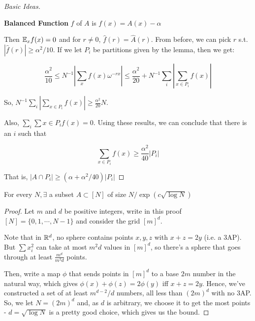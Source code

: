 \documentclass[a4paper]{article}
\begin{document}
{\begin{proof}[Basic Ideas]
	\begin{defi}
	\textbf{Balanced Function} $f$ of $A$ is $f(x)=A(x)-\alpha$
	\end{defi}
	
	Then $\mathbb{E}_xf(x)=0$ and for $r\neq0$, $\hat{f}(r)=\hat{A}(r)$. From before, we can pick $r$ s.t. $|\hat{f}(r)| \geq \alpha^2/10$. If we let $P_i$ be partitions given by the lemma, then we get:
	
	$$\frac{\alpha^2}{10}\leq N^{-1}\left|\sum_xf(x)\omega^{-rx}\right|\leq\frac{\alpha^2}{20}+N^{-1}\sum_{i}\left|\sum_{x\in P_i}f(x)\right|$$
	
	So, $N^{-1}\sum_{i}\left|\sum_{x\in P_i}f(x)\right|\geq\frac{\alpha^2}{20}N$.
	
	Also, $\sum_{i}\sum{x\in P_i}f(x)=0$. Using these results, we can conclude that there is an $i$ such that
	
	$$\sum_{x\in P_i}f(x)\geq\frac{\alpha^2}{40}\left|P_i\right|$$
	
	That is, $\left|A\cap P_i\right|\geq\left(\alpha+\alpha^2/40\right)\left|P_i\right|$
\end{proof}

\begin{thm}[Behrend, 1947]
	For every $N, \exists$ a subset $A\subset[N]$ of size $N/\exp\left(c\sqrt{\log N}\right)$
\end{thm}
\begin{proof}
	Let $m$ and $d$ be positive integers, write in this proof $[N]=\{0,1,\cdots,N-1\}$ and consider the grid $[m]^d$.
	
	Note that in $\mathbb{R}^d$, no sphere contains points $x,y,z$ with $x+z=2y$ (i.e. a 3AP). But $\sum x_i^2$ can take at most $m^2d$ values in $[m]^d$, so there's a sphere that goes through at least $\frac{m^d}{m^2d}$ points.
	
	Then, write a map $\phi$ that sends points in $[m]^d$ to a base $2m$ number in the natural way, which gives $\phi(x)+\phi(z)=2\phi(y)$ iff $x+z=2y$. Hence, we've constructed a set of at least $m^{d-2}/d$ numbers, all less than $(2m)^d$ with no 3AP. So, we let $N=(2m)^d$ and, as $d$ is arbitrary, we choose it to get the most points - $d=\sqrt{\log N}$ is a pretty good choice, which gives us the bound.
\end{proof}

}
\end{document}
